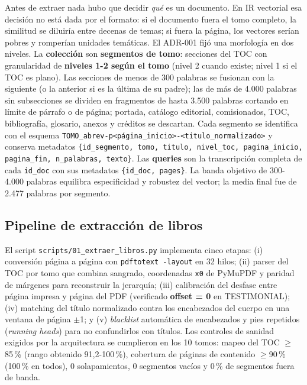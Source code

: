 \documentclass[11pt]{tg_usta}
\begin{document}
Antes de extraer nada hubo que decidir \textit{qué} es un documento. En IR vectorial esa decisión no está dada por el formato: si el documento fuera el tomo completo, la similitud se diluiría entre decenas de temas; si fuera la página, los vectores serían pobres y romperían unidades temáticas. El ADR-001 fijó una morfología en dos niveles. La \textbf{colección} son \textbf{segmentos de tomo}: secciones del TOC con granularidad de \textbf{niveles 1-2 según el tomo} (nivel 2 cuando existe; nivel 1 si el TOC es plano). Las secciones de menos de 300 palabras se fusionan con la siguiente (o la anterior si es la última de su padre); las de más de 4.000 palabras sin subsecciones se dividen en fragmentos de hasta 3.500 palabras cortando en límite de párrafo o de página; portada, catálogo editorial, comisionados, TOC, bibliografía, glosario, anexos y créditos se descartan. Cada segmento se identifica con el esquema \texttt{TOMO\_abrev-p<página\_inicio>-<titulo\_normalizado>} y conserva metadatos \texttt{\{id\_segmento, tomo, titulo, nivel\_toc, pagina\_inicio, pagina\_fin, n\_palabras, texto\}}. Las \textbf{queries} son la transcripción completa de cada \texttt{id\_doc} con sus metadatos \texttt{\{id\_doc, pages\}}. La banda objetivo de 300-4.000 palabras equilibra especificidad y robustez del vector; la media final fue de 2.477 palabras por segmento.

\subsection{Pipeline de extracción de libros}

El script \texttt{scripts/01\_extraer\_libros.py} implementa cinco etapas: (i) conversión página a página con \texttt{pdftotext -layout} en 32 hilos; (ii) parser del TOC por tomo que combina sangrado, coordenadas \texttt{x0} de PyMuPDF y paridad de márgenes para reconstruir la jerarquía; (iii) calibración del desfase entre página impresa y página del PDF (verificado \textbf{offset = 0} en TESTIMONIAL); (iv) matching del título normalizado contra los encabezados del cuerpo en una ventana de página $\pm$1; y (v) \textit{blacklist} automática de encabezados y pies repetidos (\textit{running heads}) para no confundirlos con títulos. Los controles de sanidad exigidos por la arquitectura se cumplieron en los 10 tomos: mapeo del TOC $\geq$85\,\% (rango obtenido 91,2-100\,\%), cobertura de páginas de contenido $\geq$90\,\% (100\,\% en todos), 0 solapamientos, 0 segmentos vacíos y 0\,\% de segmentos fuera de banda.
\end{document}
